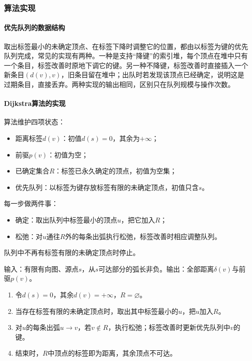 \subsubsection{算法实现}

\paragraph{优先队列的数据结构}
取出标签最小的未确定顶点、在标签下降时调整它的位置，都由以标签为键的优先队列完成，常见的实现有两种。一种是支持“降键”的索引堆，每个顶点在堆中只有一个条目，标签改善时原地下调它的键。另一种不降键，标签改善时直接插入一个新条目$(d(v),v)$，旧条目留在堆中；出队时若发现该顶点已经确定，说明这是过期条目，直接丢弃。两种实现的输出相同，区别只在队列规模与操作次数。

\paragraph{Dijkstra算法的实现}
算法维护四项状态：
\begin{itemize}
  \item 距离标签$d(v)$：初值$d(s)=0$，其余为$+\infty$；
  \item 前驱$p(v)$：初值为空；
  \item 已确定集合$R$：标签已永久确定的顶点，初值为空集；
  \item 优先队列：以标签为键存放标签有限的未确定顶点，初值只含$s$。
\end{itemize}
每一步做两件事：
\begin{itemize}
  \item 确定：取出队列中标签最小的顶点$u$，把它加入$R$；
  \item 松弛：对$u$通往$R$外的每条出弧执行松弛，标签改善时相应调整队列。
\end{itemize}
队列中不再有标签有限的未确定顶点时停止。

\begin{algorithm}[Dijkstra算法]
\label{alg:graph-opt-dijkstra}
输入：有限有向图、源点$s$，从$s$可达部分的弧长非负。输出：全部距离$\delta(v)$与前驱$p(v)$。
\begin{enumerate}
  \item 令$d(s)=0$，其余$d(v)=+\infty$，$R=\varnothing$。
  \item 当存在标签有限的未确定顶点时，取出其中标签最小的$u$，把$u$加入$R$。
  \item 对$u$的每条出弧$u\to v$，若$v\notin R$，执行松弛；标签改善时更新优先队列中$v$的键。
  \item 结束时，$R$中顶点的标签即为距离，其余顶点不可达。
\end{enumerate}
\end{algorithm}


